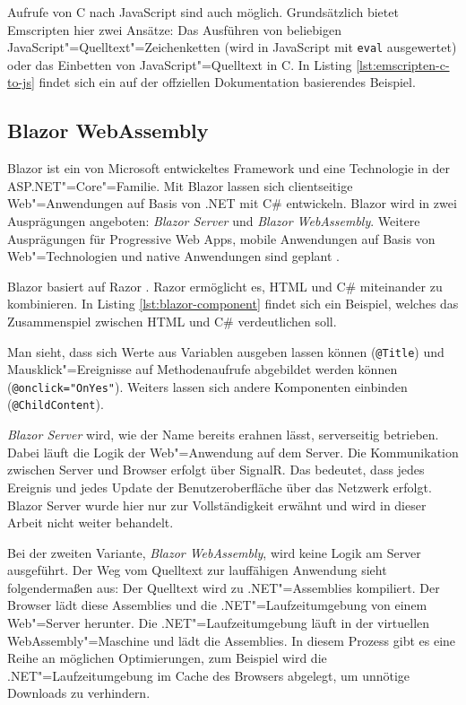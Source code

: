 Aufrufe von C nach JavaScript sind auch möglich. Grundsätzlich bietet Emscripten hier zwei Ansätze: Das Ausführen von beliebigen JavaScript"=Quelltext"=Zeichenketten (wird in JavaScript mit \lstinline{eval} ausgewertet) oder das Einbetten von JavaScript"=Quelltext in C. In Listing \ref{lst:emscripten-c-to-js} findet sich ein auf der offziellen Dokumentation basierendes Beispiel.



\subsection{Blazor WebAssembly}
Blazor \cite{Blazor} ist ein von Microsoft entwickeltes Framework und eine Technologie in der ASP.NET"=Core"=Familie. Mit Blazor lassen sich clientseitige Web"=Anwendungen auf Basis von .NET mit C\#{} entwickeln. Blazor wird in zwei Ausprägungen angeboten: \emph{Blazor Server} und \emph{Blazor WebAssembly}. Weitere Ausprägungen für Progressive Web Apps, mobile Anwendungen auf Basis von Web"=Technologien und native Anwendungen sind geplant \cite{BlazorBlog}.

Blazor basiert auf Razor \cite{Razor}. Razor ermöglicht es, HTML und C\#{} miteinander zu kombinieren. In Listing \ref{lst:blazor-component} findet sich ein Beispiel, welches das Zusammenspiel zwischen HTML und C\#{} verdeutlichen soll.

\pagebreak


Man sieht, dass sich Werte aus Variablen ausgeben lassen können (\lstinline{@Title}) und Mausklick"=Ereignisse auf Methodenaufrufe abgebildet werden können (\lstinline{@onclick="OnYes"}). Weiters lassen sich andere Komponenten einbinden (\lstinline{@ChildContent}).

\emph{Blazor Server} wird, wie der Name bereits erahnen lässt, serverseitig betrieben. Dabei läuft die Logik der Web"=Anwendung auf dem Server. Die Kommunikation zwischen Server und Browser erfolgt über SignalR. Das bedeutet, dass jedes Ereignis und jedes Update der Benutzeroberfläche über das Netzwerk erfolgt. Blazor Server wurde hier nur zur Vollständigkeit erwähnt und wird in dieser Arbeit nicht weiter behandelt.

Bei der zweiten Variante, \emph{Blazor WebAssembly}, wird keine Logik am Server ausgeführt. Der Weg vom Quelltext zur lauffähigen Anwendung sieht folgendermaßen aus: Der Quelltext wird zu .NET"=Assemblies kompiliert. Der Browser lädt diese Assemblies und die .NET"=Laufzeitumgebung von einem Web"=Server herunter. Die .NET"=Laufzeitumgebung läuft in der virtuellen WebAssembly"=Maschine und lädt die Assemblies. In diesem Prozess gibt es eine Reihe an möglichen Optimierungen, zum Beispiel wird die .NET"=Laufzeitumgebung im Cache des Browsers abgelegt, um unnötige Downloads zu verhindern.


